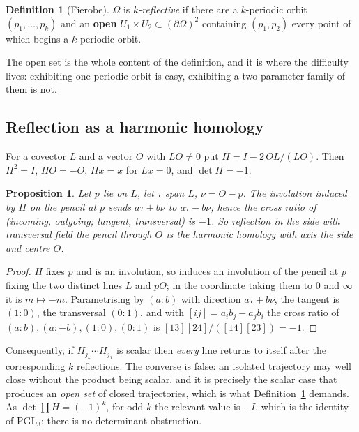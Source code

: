 \documentclass[11pt,a4paper]{article}
\theoremstyle{plain}
\newtheorem{proposition}[theorem]{Proposition}
\theoremstyle{definition}
\newtheorem{definition}[theorem]{Definition}
\theoremstyle{remark}
\newcommand{\PGL}{\mathrm{PGL}}
\begin{document}
\begin{definition}[Fierobe]\label{def:krefl}
$\Omega$ is \emph{$k$-reflective} if there are a $k$-periodic orbit
$(p_1,\dots,p_k)$ and an \textbf{open} $U_1\times U_2\subset(\partial\Omega)^2$
containing $(p_1,p_2)$ every point of which begins a $k$-periodic orbit.
\end{definition}

The open set is the whole content of the definition, and it is where the difficulty
lives: exhibiting one periodic orbit is easy, exhibiting a two-parameter family of
them is not.

\subsection{Reflection as a harmonic homology}

For a covector $L$ and a vector $O$ with $LO\neq0$ put $H=I-2\,OL/(LO)$. Then
$H^2=I$, $HO=-O$, $Hx=x$ for $Lx=0$, and $\det H=-1$.

\begin{proposition}\label{prop:law}
Let $p$ lie on $L$, let $\tau$ span $L$, $\nu=O-p$. The involution induced by $H$
on the pencil at $p$ sends $a\tau+b\nu$ to $a\tau-b\nu$; hence the cross ratio of
(incoming, outgoing; tangent, transversal) is $-1$. So reflection in the side with
transversal field the pencil through $O$ \emph{is} the harmonic homology with axis
the side and centre $O$.
\end{proposition}

\begin{proof}
$H$ fixes $p$ and is an involution, so induces an involution of the pencil at $p$
fixing the two distinct lines $L$ and $pO$; in the coordinate taking them to $0$
and $\infty$ it is $m\mapsto-m$. Parametrising by $(a:b)$ with direction
$a\tau+b\nu$, the tangent is $(1:0)$, the transversal $(0:1)$, and with
$[ij]=a_ib_j-a_jb_i$ the cross ratio of $(a:b),(a:-b),(1:0),(0:1)$ is
$[13][24]/([14][23])=-1$.
\end{proof}

Consequently, if $H_{j_k}\cdots H_{j_1}$ is scalar then \emph{every} line returns to
itself after the corresponding $k$ reflections. The converse is false: an isolated
trajectory may well close without the product being scalar, and it is precisely the
scalar case that produces an \emph{open set} of closed trajectories, which is what
Definition~\ref{def:krefl} demands. As $\det\prod H=(-1)^k$, for odd $k$ the
relevant value is $-I$, which is the identity of $\PGL_3$: there is no determinant
obstruction.
\end{document}
